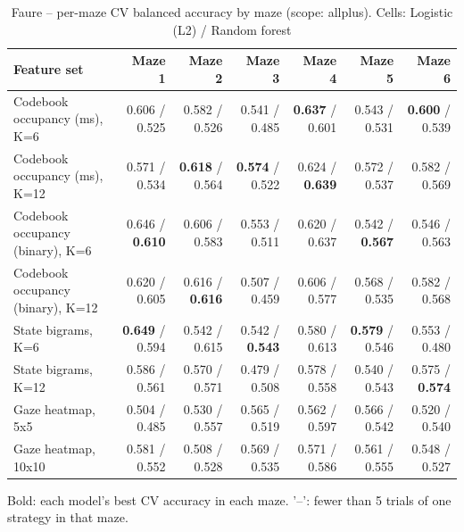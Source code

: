 \begin{table}[t]
\centering
\caption{Faure -- per-maze CV balanced accuracy by maze (scope: allplus). Cells: Logistic (L2) / Random forest}
\label{tab:permaze_by_maze_Faure}
\begin{tabular}{lrrrrrr}
\toprule
Feature set & Maze 1 & Maze 2 & Maze 3 & Maze 4 & Maze 5 & Maze 6 \\
\midrule
Codebook occupancy (ms), K=6 & 0.606 / 0.525 & 0.582 / 0.526 & 0.541 / 0.485 & \textbf{0.637} / 0.601 & 0.543 / 0.531 & \textbf{0.600} / 0.539 \\
Codebook occupancy (ms), K=12 & 0.571 / 0.534 & \textbf{0.618} / 0.564 & \textbf{0.574} / 0.522 & 0.624 / \textbf{0.639} & 0.572 / 0.537 & 0.582 / 0.569 \\
Codebook occupancy (binary), K=6 & 0.646 / \textbf{0.610} & 0.606 / 0.583 & 0.553 / 0.511 & 0.620 / 0.637 & 0.542 / \textbf{0.567} & 0.546 / 0.563 \\
Codebook occupancy (binary), K=12 & 0.620 / 0.605 & 0.616 / \textbf{0.616} & 0.507 / 0.459 & 0.606 / 0.577 & 0.568 / 0.535 & 0.582 / 0.568 \\
State bigrams, K=6 & \textbf{0.649} / 0.594 & 0.542 / 0.615 & 0.542 / \textbf{0.543} & 0.580 / 0.613 & \textbf{0.579} / 0.546 & 0.553 / 0.480 \\
State bigrams, K=12 & 0.586 / 0.561 & 0.570 / 0.571 & 0.479 / 0.508 & 0.578 / 0.558 & 0.540 / 0.543 & 0.575 / \textbf{0.574} \\
Gaze heatmap, 5x5 & 0.504 / 0.485 & 0.530 / 0.557 & 0.565 / 0.519 & 0.562 / 0.597 & 0.566 / 0.542 & 0.520 / 0.540 \\
Gaze heatmap, 10x10 & 0.581 / 0.552 & 0.508 / 0.528 & 0.569 / 0.535 & 0.571 / 0.586 & 0.561 / 0.555 & 0.548 / 0.527 \\
\bottomrule
\end{tabular}
\par\smallskip
{\footnotesize Bold: each model's best CV accuracy in each maze. '--': fewer than 5 trials of one strategy in that maze.}
\end{table}
